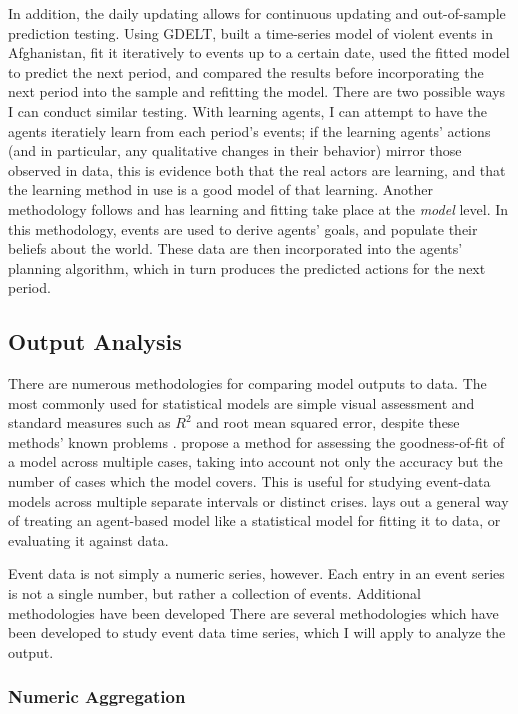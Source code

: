 In addition, the daily updating allows for continuous updating and out-of-sample prediction testing. Using GDELT, \citet{yonamine_2013} built a time-series model of violent events in Afghanistan, fit it iteratively to events up to a certain date, used the fitted model to predict the next period, and compared the results before incorporating the next period into the sample and refitting the model. There are two possible ways I can conduct similar testing. With learning agents, I can attempt to have the agents iteratiely learn from each period's events; if the learning agents' actions (and in particular, any qualitative changes in their behavior) mirror those observed in data, this is evidence both that the real actors are learning, and that the learning method in use is a good model of that learning. Another methodology follows \citet{taylor_2009} and has learning and fitting take place at the \emph{model} level. In this methodology, events are used to derive agents' goals, and populate their beliefs about the world. These data are then incorporated into the agents' planning algorithm, which in turn produces the predicted actions for the next period.

\subsection{Output Analysis}\label{output-analysis}

There are numerous methodologies for comparing model outputs to data. The most commonly used for statistical models are simple visual assessment and standard measures such as $R^2$ and root mean squared error, despite these methods' known problems \citep{schunn_2005}. \citet{khemlani_2014} propose a method for assessing the goodness-of-fit of a model across multiple cases, taking into account not only the accuracy but the number of cases which the model covers. This is useful for studying event-data models across multiple separate intervals or distinct crises. \citet{klemens_2014} lays out a general way of treating an agent-based model like a statistical model for fitting it to data, or evaluating it against data.

Event data is not simply a numeric series, however. Each entry in an event series is not a single number, but rather a collection of events. Additional methodologies have been developed There are several methodologies which have been developed to study event data time series, which I will apply to analyze the output.

\subsubsection{Numeric Aggregation}\label{numeric-aggregation}

